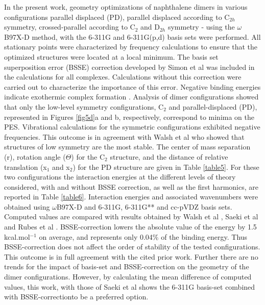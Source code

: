 In the present work, geometry optimizations of naphthalene dimers in various configurations parallel displaced (PD), parallel displaced according to C$_{2h}$ symmetry, crossed-parallel according to C$_{2}$ and D$_{2h}$ symmetry - using the $\omega$B97X-D method, with the 6-311G and 6-311G(p,d) basis sets were performed. All stationary points were characterized by frequency calculations to ensure that the optimized structures were located at a local minimum. The basis set superposition error (BSSE) correction developed by Simon et al \cite{simon1996does} was included in the calculations for all complexes. Calculations without this correction were carried out to characterize the importance of this error. Negative binding energies indicate exothermic complex formation \cite{boys2002calculation}. Analysis of dimer configurations showed that only the low-level symmetry configurations, C$_{2}$ and parallel-displaced (PD), represented in Figures \ref{fig5d}a and b, respectively, correspond to minima on the PES. Vibrational calculations for the symmetric configurations exhibited negative frequencies. This outcome is in agreement with Walsh et al \cite{walsh2002ab} who showed that structures of low symmetry are the most stable. The center of mass separation (r), rotation angle ($\Theta$) for the C$_{2}$ structure, and the distance of relative translation (x$_{1}$ and x$_{2}$) for the PD structure are given in Table \ref{table5}. For these two configurations the interaction energies at the different levels of theory considered, with and without BSSE correction, as well as the first harmonics, are reported in Table \ref{table6}. Interaction energies and associated wavenumbers were obtained using $\omega$B97X-D and 6-311G, 6-311G** and cc-pVDZ basis sets. Computed values are compared with results obtained by Walsh et al \cite{walsh2002ab}, Saeki et al \cite{saeki2006theoretical} and Rubes et al \cite{rubevs2008investigation}. BSSE-correction lowers the absolute value of the energy by 1.5 kcal.mol$^{-1}$ on average, and represents only 0.04\% of the binding energy.  Thus BSSE-correction does not affect the order of stability of the tested configurations. This outcome is in full agreement with the cited prior work. Further there are no trends for the impact of basis-set and BSSE-correction on the geometry of the dimer configurations. However, by calculating the mean difference of computed values, this work, with those of Saeki et al \cite{saeki2006theoretical} shows the  6-311G basis-set combined with BSSE-correctionto be a preferred option.

